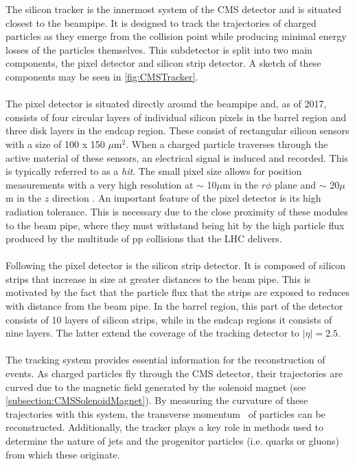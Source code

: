 The silicon tracker \cite{CMSTracker} is the innermost system of the CMS detector and is situated closest to the beampipe. It is designed to track the trajectories of charged particles as they emerge from the collision point while producing minimal energy losses of the particles themselves. This subdetector is split into two main components, the pixel detector and silicon strip detector. A sketch of these components may be seen in \autoref{fig:CMSTracker}. \\
\\
The pixel detector is situated directly around the beampipe and, as of 2017, consists of four circular layers of individual silicon pixels in the barrel region and three disk layers in the endcap region. These consist of rectangular silicon sensors with a size of 100 x 150 $\mu$m$^2$. When a charged particle traverses through the active material of these sensors, an electrical signal is induced and recorded. This is typically referred to as a \textit{hit}. The small pixel size allows for position measurements with a very high resolution at $\sim$ 10$\mu$m in the $r$$\phi$ plane and $\sim$ 20$\mu$m in the $z$ direction \cite{CMSTrackerResolution}. An important feature of the pixel detector is its high radiation tolerance. This is necessary due to the close proximity of these modules to the beam pipe, where they must withstand being hit by the high particle flux produced by the multitude of pp collisions that the LHC delivers. \\
\\
Following the pixel detector is the silicon strip detector. It is composed of silicon strips that increase in size at greater distances to the beam pipe. This is motivated by the fact that the particle flux that the strips are exposed to reduces with distance from the beam pipe. In the barrel region, this part of the detector consists of 10 layers of silicon strips, while in the endcap regions it consists of nine layers. The latter extend the coverage of the tracking detector to $\mid$$\eta$$\mid=2.5$. \\
\\
The tracking system provides essential information for the reconstruction of events. As charged particles fly through the CMS detector, their trajectories are curved due to the magnetic field generated by the solenoid magnet (see \autoref{subsection:CMSSolenoidMagnet}). By measuring the curvature of these trajectories with this system, the transverse momentum \pt \, of particles can be reconstructed. Additionally, the tracker plays a key role in methods used to determine the nature of jets and the progenitor particles (i.e. quarks or gluons) from which these originate. \\
\\
